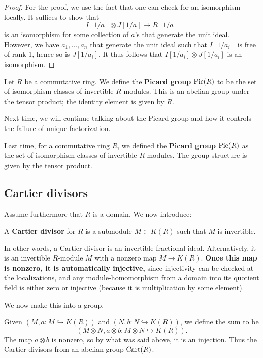 \begin{proof}
For the proof, we use the fact that one can check for an isomorphism locally.  
It suffices to show that 
\[ I[1/a] \otimes J[1/a] \to R[1/a]  \]
is an isomorphism for some collection of $a$'s that generate the unit ideal.
However, we have $a_1, \dots, a_n$ that generate the unit ideal such that
$I[1/a_i]$ is free of rank 1, hence so is $J[1/a_i]$. It thus follows that
$I[1/a_i] \otimes J[1/a_i]$ is an isomorphism.
\end{proof} 


\begin{definition} 
Let $R$ be a commutative ring. We define the \textbf{Picard group} $\mathrm{Pic}(R)$ to
be the set of isomorphism classes of invertible $R$-modules. This is an abelian group
under the tensor product; the identity element is given by $R$. 
\end{definition} 

Next time, we will continue talking about the Picard group and how it controls
the failure of unique factorization.


Last time, for a commutative ring $R$, we defined the \textbf{Picard group}
$\mathrm{Pic}(R)$ as the set of isomorphism classes of invertible $R$-modules. The
group structure is given by the tensor product.

\subsection{Cartier divisors}

Assume furthermore that $R$ is a domain. We now introduce:

\begin{definition} 
A \textbf{Cartier divisor} for $R$ is a submodule $M \subset K(R)$ such that
$M$ is invertible. 
\end{definition} 
In other words, a Cartier divisor is an invertible fractional ideal.
Alternatively, it is an invertible $R$-module $M$ with a nonzero map $M \to
K(R)$. \textbf{ Once this map is nonzero, it is automatically injective,} since
injectivity can be checked at the localizations, and any module-homomorphism from a domain into
its quotient field is either zero or injective (because it is multiplication by
some element). 


We now make this into a group. 
\begin{definition} 
Given $(M, a: M \hookrightarrow K(R))$ and $(N, b: N \hookrightarrow K(R))$, we
define the sum to be 
\[  (M \otimes N, a \otimes b: M \otimes N \hookrightarrow K(R)). \]
The map $a \otimes b$ is nonzero, so by what was said above, it is an injection.
Thus the Cartier divisors from an abelian group $\mathrm{Cart}(R)$.
\end{definition} 

